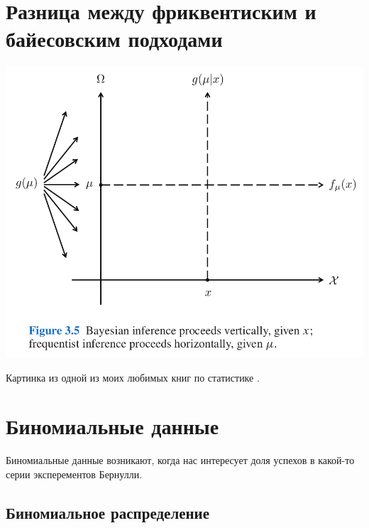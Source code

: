 \documentclass[
]{book}
\begin{document}
\hypertarget{ux440ux430ux437ux43dux438ux446ux430-ux43cux435ux436ux434ux443-ux444ux440ux438ux43aux432ux435ux43dux442ux438ux441ux43aux438ux43c-ux438-ux431ux430ux439ux435ux441ux43eux432ux441ux43aux438ux43c-ux43fux43eux434ux445ux43eux434ux430ux43cux438}{%
\section{Разница между фриквентиским и байесовским подходами}\label{ux440ux430ux437ux43dux438ux446ux430-ux43cux435ux436ux434ux443-ux444ux440ux438ux43aux432ux435ux43dux442ux438ux441ux43aux438ux43c-ux438-ux431ux430ux439ux435ux441ux43eux432ux441ux43aux438ux43c-ux43fux43eux434ux445ux43eux434ux430ux43cux438}}

\includegraphics{images/gelman.png}

Картинка из одной из моих любимых книг по статистике \citep[34]{efron16}.

\hypertarget{ux431ux438ux43dux43eux43cux438ux430ux43bux44cux43dux44bux435-ux434ux430ux43dux43dux44bux435}{%
\section{Биномиальные данные}\label{ux431ux438ux43dux43eux43cux438ux430ux43bux44cux43dux44bux435-ux434ux430ux43dux43dux44bux435}}

Биномиальные данные возникают, когда нас интересует доля успехов в какой-то серии эксперементов Бернулли.

\hypertarget{ux431ux438ux43dux43eux43cux438ux430ux43bux44cux43dux43eux435-ux440ux430ux441ux43fux440ux435ux434ux435ux43bux435ux43dux438ux435-1}{%
\subsection{Биномиальное распределение}\label{ux431ux438ux43dux43eux43cux438ux430ux43bux44cux43dux43eux435-ux440ux430ux441ux43fux440ux435ux434ux435ux43bux435ux43dux438ux435-1}}
\end{document}
